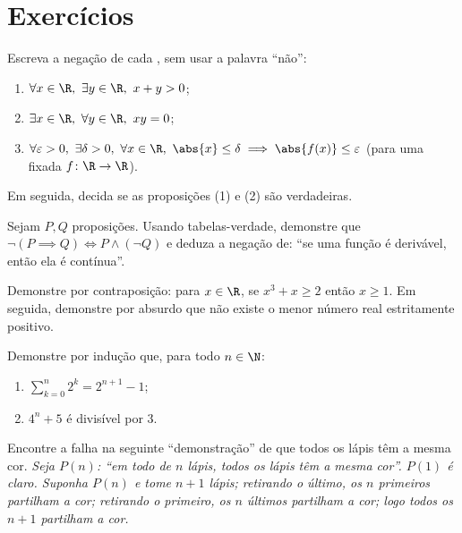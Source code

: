 \section{Exercícios}

\begin{exercise}[$\star$]\label{exo:b1:logic:1}
Escreva a negação de cada , sem usar a palavra ``não'':
\begin{enumerate}
  \item $\forall x \in \R,\ \exists y \in \R,\ x + y > 0$;
  \item $\exists x \in \R,\ \forall y \in \R,\ xy = 0$;
  \item $\forall \varepsilon > 0,\ \exists \delta > 0,\ \forall x \in
        \R,\ \abs{x} \leq \delta \implies \abs{f(x)} \leq \varepsilon$
        (para uma  fixada $f \colon \R \to \R$).
\end{enumerate}
Em seguida, decida se as proposições (1) e (2) são verdadeiras.
\end{exercise}

\begin{exercise}[$\star$]\label{exo:b1:logic:2}
Sejam $P, Q$ proposições. Usando tabelas-verdade, demonstre que
$\lnot(P \implies Q) \iff P \land (\lnot Q)$ e deduza a negação de: ``se uma função é
derivável, então ela é contínua''.
\end{exercise}

\begin{exercise}[$\star$]\label{exo:b1:logic:3}
Demonstre por contraposição: para $x \in \R$, se $x^3 + x \geq 2$ então
$x \geq 1$. Em seguida, demonstre por absurdo que não existe o menor
número real estritamente positivo.
\end{exercise}

\begin{exercise}[$\star$]\label{exo:b1:logic:4}
Demonstre por indução que, para todo $n \in \N$:
\begin{enumerate}
  \item $\sum_{k=0}^{n} 2^k = 2^{n+1} - 1$;
  \item $4^n + 5$ é divisível por $3$.
\end{enumerate}
\end{exercise}

\begin{exercise}[$\star$]\label{exo:b1:logic:5}
Encontre a falha na seguinte ``demonstração'' de que todos os lápis têm a
mesma cor. \emph{Seja $P(n)$: ``em todo  de $n$ lápis, todos os
lápis têm a mesma cor''. $P(1)$ é claro. Suponha $P(n)$ e tome $n+1$
lápis; retirando o último, os $n$ primeiros partilham a cor; retirando o
primeiro, os $n$ últimos partilham a cor; logo todos os $n+1$ partilham
a cor.}
\end{exercise}

